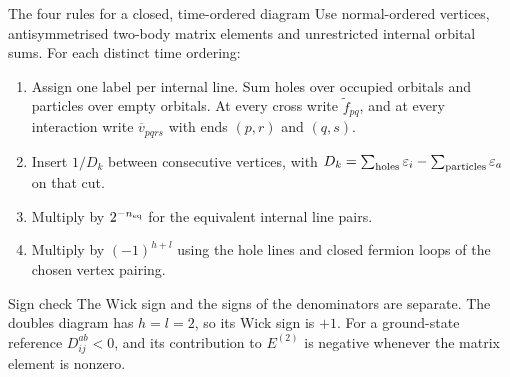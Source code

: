 \documentclass[aspectratio=169,10pt]{beamer}
\newcommand{\vbar}[4]{\overline v_{#1#2#3#4}}
\newcommand{\ftil}[1]{\tilde f_{#1}}
\begin{document}
\begin{frame}{The four rules for a closed, time-ordered diagram}
Use normal-ordered vertices, antisymmetrised two-body matrix elements and unrestricted internal orbital sums. For each distinct time ordering:
\begin{enumerate}
\item Assign one label per internal line. Sum holes over occupied orbitals and particles over empty orbitals. At every cross write $\ftil{pq}$, and at every interaction write $\vbar{p}{q}{r}{s}$ with ends $(p,r)$ and $(q,s)$.
\item Insert $1/D_k$ between consecutive vertices, with $D_k=\sum_{\rm holes}\varepsilon_i-\sum_{\rm particles}\varepsilon_a$ on that cut.
\item Multiply by $2^{-n_{\rm eq}}$ for the equivalent internal line pairs.
\item Multiply by $(-1)^{h+l}$ using the hole lines and closed fermion loops of the chosen vertex pairing.
\end{enumerate}
\begin{block}{Sign check}
The Wick sign and the signs of the denominators are separate. The doubles diagram has $h=l=2$, so its Wick sign is $+1$. For a ground-state reference $D_{ij}^{ab}<0$, and its contribution to $E^{(2)}$ is negative whenever the matrix element is nonzero.
\end{block}
\end{frame}
\end{document}

